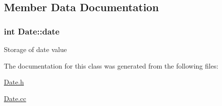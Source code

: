 \subsection{Member Data Documentation}
\hypertarget{classDate_abfe1e095c0de4e7d1ce6ae1ac97026d5}{
\subsubsection[{date}]{\setlength{\rightskip}{0pt plus 5cm}int Date\-::date\hspace{0.3cm}{\ttfamily [private]}}}\label{classDate_abfe1e095c0de4e7d1ce6ae1ac97026d5}
Storage of date value 

The documentation for this class was generated from the following files\-:\begin{DoxyCompactItemize}
\item 
\hyperlink{Date_8h}{Date.\-h}\item 
\hyperlink{Date_8cc}{Date.\-cc}\end{DoxyCompactItemize}
